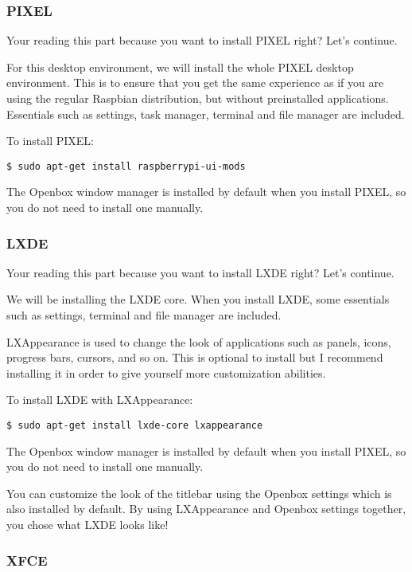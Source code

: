 		\subsubsection*{PIXEL}
		
			Your reading this part because you want to install PIXEL right? Let's continue.
			
			For this desktop environment, we will install the whole PIXEL desktop environment. This is to ensure that you get the same experience as if you are using the regular Raspbian distribution, but without preinstalled applications. Essentials such as settings, task manager, terminal and file manager are included.
			
			To install PIXEL:
\begin{lstlisting}[breaklines=true]
$ sudo apt-get install raspberrypi-ui-mods
\end{lstlisting}
			
			The Openbox window manager is installed by default when you install PIXEL, so you do not need to install one manually.
			
		\subsubsection*{LXDE}
			
			Your reading this part because you want to install LXDE right? Let's continue.
			
			We will be installing the LXDE core. When you install LXDE, some essentials such as settings, terminal and file manager are included.
			
			LXAppearance is used to change the look of applications such as panels, icons, progress bars, cursors, and so on. This is optional to install but I recommend installing it in order to give yourself more customization abilities.
			
			To install LXDE with LXAppearance:
\begin{lstlisting}[breaklines=true]
$ sudo apt-get install lxde-core lxappearance
\end{lstlisting}

			The Openbox window manager is installed by default when you install PIXEL, so you do not need to install one manually.
			
			You can customize the look of the titlebar using the Openbox settings which is also installed by default. By using LXAppearance and Openbox settings together, you chose what LXDE looks like!
			
		\subsubsection*{XFCE}
		
